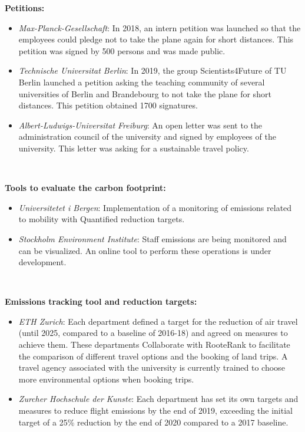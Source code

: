 \documentclass[version=3.21, pagesize, twoside=off, bibliography=totoc, DIV=calc, fontsize=12pt, a4paper]{scrartcl}
\begin{document}
\textbf{Petitions:} 
\begin{itemize}
\item \emph{Max-Planck-Gesellschaft}: In 2018, an intern petition was launched so that the employees could pledge not to take the plane again for short distances. This petition was signed by 500 persons and was made public. 
\item \emph{Technische Universitat Berlin}: In 2019, the group Scientists4Future of TU Berlin launched a petition asking the teaching community of several universities of Berlin and Brandebourg to not take the plane for short distances. This petition obtained 1700 signatures.
\item \emph{Albert-Ludwigs-Universitat Freiburg}: An open letter was sent to the administration council of the university and signed by employees of the university. This letter was asking for a sustainable travel policy. 
\end{itemize}

\

\textbf{Tools to evaluate the carbon footprint:}
\begin{itemize}
\item \emph{Universitetet i Bergen}: Implementation of a monitoring of emissions related to mobility with Quantified reduction targets. 
\item \emph{Stockholm Environment Institute}: Staff emissions are being monitored and can be visualized. An online tool to perform these operations is under development.
\end{itemize}

\

\textbf{Emissions tracking tool and reduction targets:}
\begin{itemize}    
\item \emph{ETH Zurich}: Each department defined a target for the reduction of air travel (until 2025, compared to a baseline of 2016-18) and agreed on measures to achieve them. These departments Collaborate with RooteRank to facilitate the comparison of different travel options and the booking of land trips. A travel agency associated with the university is currently trained to choose more environmental options when booking trips.
\item \emph{Zurcher Hochschule der Kunste}: Each department has set its own targets and measures to reduce flight emissions by the end of 2019, exceeding the initial target of a 25\% reduction by the end of 2020 compared to a 2017 baseline.
\end{itemize}
\end{document}
